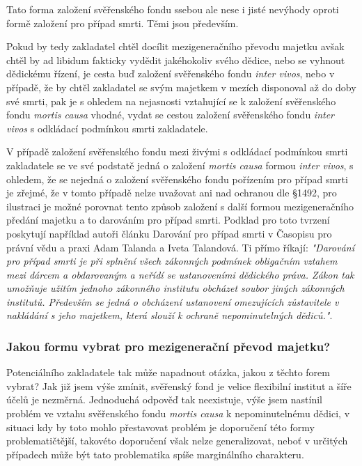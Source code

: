 \documentclass{article}
\begin{document}
Tato forma založení svěřenského fondu ssebou ale nese i jisté nevýhody oproti formě založení pro případ smrti. Těmi jsou především.

Pokud by tedy zakladatel chtěl docílit mezigeneračního převodu majetku avšak chtěl by ad libidum fakticky vydědit jakéhokoliv svého dědice, nebo se vyhnout dědickému řízení, je cesta buď založení svěřenského fondu \textit{inter vivos}, nebo v případě, že by chtěl zakladatel se svým majetkem v mezích disponoval až do doby své smrti, pak je s ohledem na nejasnosti vztahující se k založení svěřenského fondu \textit{mortis causa} vhodné, vydat se cestou založení svěřenského fondu \textit{inter vivos} s odkládací podmínkou smrti zakladatele.

V případě založení svěřenského fondu mezi živými s odkládací podmínkou smrti zakladatele se ve své podstatě jedná o založení \textit{mortis causa} formou \textit{inter vivos}, s ohledem, že se nejedná o založení svěřenského fondu pořízením pro případ smrti je zřejmé, že v tomto případě nelze uvažovat ani nad ochranou dle §1492, pro ilustraci je možné porovnat tento způsob založení s další formou mezigeneračního předání majetku a to darováním pro případ smrti. Podklad pro toto tvrzení poskytují například autoři článku Darování pro případ smrti v Časopisu pro právní vědu a praxi Adam Talanda a Iveta Talandová. Ti přímo říkají: \textit{"Darování pro případ smrti je při splnění všech zákonných podmínek obligačním vztahem mezi dárcem a obdarovaným a neřídí se ustanoveními dědického práva. Zákon tak umožňuje užitím jednoho zákonného institutu obcházet soubor jiných zákonných institutů. Především se jedná o obcházení ustanovení omezujících zůstavitele v nakládání s jeho majetkem, která slouží k ochraně nepominutelných dědiců."}.\\



\subsubsection{Jakou formu vybrat pro mezigenerační převod majetku?}

Potenciálního zakladatele tak může napadnout otázka, jakou z těchto forem vybrat? Jak již jsem výše zmínit, svěřenský fond je velice flexibilní institut a šíře účelů je nezměrná. Jednoduchá odpověď tak neexistuje, výše jsem nastínil problém ve vztahu svěřenského fondu \textit{mortis causa} k nepominutelnému dědici, v situaci kdy by toto mohlo přestavovat problém je doporučení této formy problematičtější, takovéto doporučení však nelze generalizovat, neboť v určitých případech může být tato problematika spíše marginálního charakteru.\\
\end{document}
